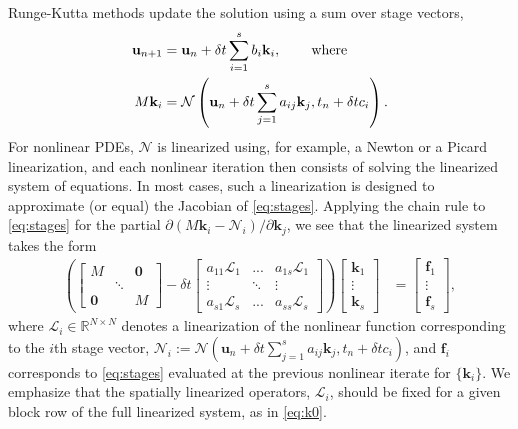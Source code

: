 \documentclass[review]{siamart}
\begin{document}
Runge-Kutta methods update the solution using a sum over stage vectors,
%
\begin{align}\label{eq:update}
\mathbf{u}_{n+1} & = \mathbf{u}_n + \delta t \sum_{i=1}^s b_i\mathbf{k}_i,
	\hspace{5ex}\textnormal{where}\\
M\mathbf{k}_i & = \mathcal{N}\left(\mathbf{u}_n + \delta t\sum_{j=1}^s a_{ij}\mathbf{k}_j, t_n+\delta tc_i\right).\label{eq:stages}
\end{align}
%
For nonlinear PDEs, $\mathcal{N}$ is linearized using, for example, a Newton or a
Picard linearization, and each nonlinear iteration then consists of solving the
linearized system of equations. In most cases, such a linearization
is designed to approximate (or equal) the Jacobian of \eqref{eq:stages}. Applying
the chain rule to \eqref{eq:stages} for the partial
$\partial(M\mathbf{k}_i-\mathcal{N}_i)/\partial\mathbf{k}_j$, we see that
the linearized system takes the form
%
\begin{align}\label{eq:k0}
\left( \begin{bmatrix} M  & & \mathbf{0} \\ & \ddots \\ \mathbf{0} & & M\end{bmatrix}
	- \delta t \begin{bmatrix} a_{11}\mathcal{L}_1 & ... & a_{1s}\mathcal{L}_1 \\
	\vdots & \ddots & \vdots \\ a_{s1}\mathcal{L}_s & ... & a_{ss} \mathcal{L}_s \end{bmatrix} \right)
	\begin{bmatrix} \mathbf{k}_1 \\ \vdots \\ \mathbf{k}_s \end{bmatrix}
& = \begin{bmatrix} \mathbf{f}_1 \\ \vdots \\ \mathbf{f}_s \end{bmatrix},
\end{align}
%
where $\mathcal{L}_i\in\mathbb{R}^{N\times N}$ denotes a linearization of the
nonlinear function corresponding to the $i$th stage vector, $\mathcal{N}_i:=
\mathcal{N}\left(\mathbf{u}_n + \delta t\sum_{j=1}^s a_{ij}\mathbf{k}_j,
t_n+\delta tc_i\right)$, and $\mathbf{f}_i$ corresponds to \eqref{eq:stages}
evaluated at the previous nonlinear iterate for $\{\mathbf{k}_i\}$. We emphasize
that the spatially linearized operators, $\mathcal{L}_i$, should be fixed for a
given block row of the full linearized system, as in \eqref{eq:k0}.
\end{document}
